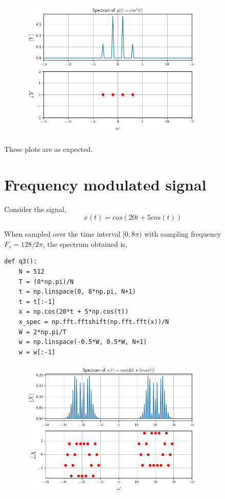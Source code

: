 \documentclass[12pt, a4paper]{article}
\begin{document}
\begin{figure}[H]
\centering
\includegraphics[width=0.8\textwidth]{q2cos.png}
\end{figure}

These plots are as expected.

\section{Frequency modulated signal}

Consider the signal,
\begin{equation*}
x(t) = cos(20t + 5cos(t))
\end{equation*}

When sampled over the time interval $[0, 8\pi)$ with sampling frequency $F_s = 128/2\pi$, the spectrum obtained is,

\begin{lstlisting}
def q3():
    N = 512
    T = (8*np.pi)/N
    t = np.linspace(0, 8*np.pi, N+1)
    t = t[:-1]
    x = np.cos(20*t + 5*np.cos(t))
    x_spec = np.fft.fftshift(np.fft.fft(x))/N
    W = 2*np.pi/T
    w = np.linspace(-0.5*W, 0.5*W, N+1)
    w = w[:-1]
\end{lstlisting}

\begin{figure}[H]
\centering
\includegraphics[width=0.8\textwidth]{q3.png}
\end{figure}
\end{document}
